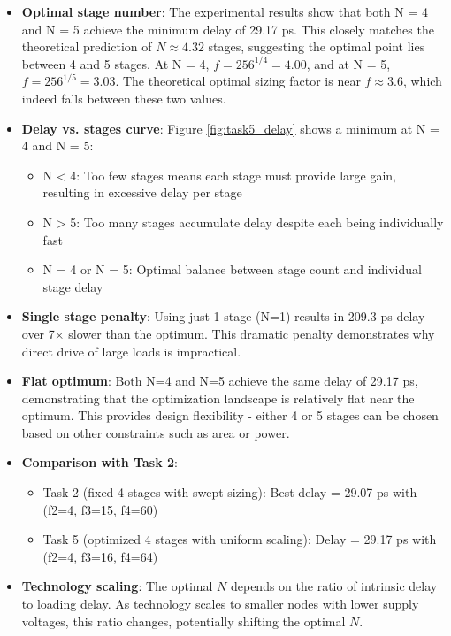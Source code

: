 \documentclass[UTF8,12pt,a4paper]{ctexart}
\begin{document}
\begin{itemize}
    \item[1. ] \textbf{Optimal stage number}: The experimental results show that both N = 4 and N = 5 achieve the minimum delay of 29.17 ps. This closely matches the theoretical prediction of $N \approx 4.32$ stages, suggesting the optimal point lies between 4 and 5 stages. At N = 4, $f = 256^{1/4} = 4.00$, and at N = 5, $f = 256^{1/5} = 3.03$. The theoretical optimal sizing factor is near $f \approx 3.6$, which indeed falls between these two values.

    \item[2. ] \textbf{Delay vs. stages curve}: Figure \ref{fig:task5_delay} shows a minimum at N = 4 and N = 5:
    \begin{itemize}
        \item N < 4: Too few stages means each stage must provide large gain, resulting in excessive delay per stage
        \item N > 5: Too many stages accumulate delay despite each being individually fast
        \item N = 4 or N = 5: Optimal balance between stage count and individual stage delay
    \end{itemize}
    
    \item[3. ] \textbf{Single stage penalty}: Using just 1 stage (N=1) results in 209.3 ps delay - over 7× slower than the optimum. This dramatic penalty demonstrates why direct drive of large loads is impractical.
    
    \item[4. ] \textbf{Flat optimum}: Both N=4 and N=5 achieve the same delay of 29.17 ps, demonstrating that the optimization landscape is relatively flat near the optimum. This provides design flexibility - either 4 or 5 stages can be chosen based on other constraints such as area or power.
    
    \item[5. ] \textbf{Comparison with Task 2}: 
    \begin{itemize}
        \item Task 2 (fixed 4 stages with swept sizing): Best delay = 29.07 ps with (f2=4, f3=15, f4=60)
        \item Task 5 (optimized 4 stages with uniform scaling): Delay = 29.17 ps with (f2=4, f3=16, f4=64)
    \end{itemize}

    \item[6. ] \textbf{Technology scaling}: The optimal $N$ depends on the ratio of intrinsic delay to loading delay. As technology scales to smaller nodes with lower supply voltages, this ratio changes, potentially shifting the optimal $N$.
\end{itemize}
\end{document}
